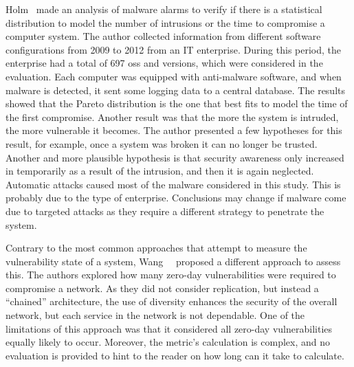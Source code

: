 Holm~\cite{Holm:2014} made an analysis of malware alarms to verify if there is a statistical distribution to model the number of intrusions or the time to compromise a computer system.
The author collected information from different software configurations from 2009 to 2012 from an IT enterprise.
During this period, the enterprise had a total of 697 \glspl{os} and versions, which were considered in the evaluation.
Each computer was equipped with anti-malware software, and when malware is detected, it sent some logging data to a central database.
The results showed that the Pareto distribution is the one that best fits to model the time of the first compromise.
Another result was that the more the system is intruded, the more vulnerable it becomes. 
The author presented a few hypotheses for this result, for example, once a system was broken it can no longer be trusted. 
Another and more plausible hypothesis is that security awareness only increased in temporarily as a result of the intrusion, and then it is again neglected.
Automatic attacks caused most of the malware considered in this study.
This is probably due to the type of enterprise. 
Conclusions may change if malware come due to targeted attacks as they require a different strategy to penetrate the system.

Contrary to the most common approaches that attempt to measure the vulnerability state of a system, Wang~\etal{}~\cite{Wang:2014} proposed a different approach to assess this.
The authors explored how many zero-day vulnerabilities were required to compromise a network. 
As they did not consider replication, but instead a ``chained'' architecture, the use of diversity enhances the security of the overall network, but each service in the network is not dependable.
One of the limitations of this approach was that it considered all zero-day vulnerabilities equally likely to occur.
Moreover, the metric's calculation is complex, and no evaluation is provided to hint to the reader on how long can it take to calculate.


